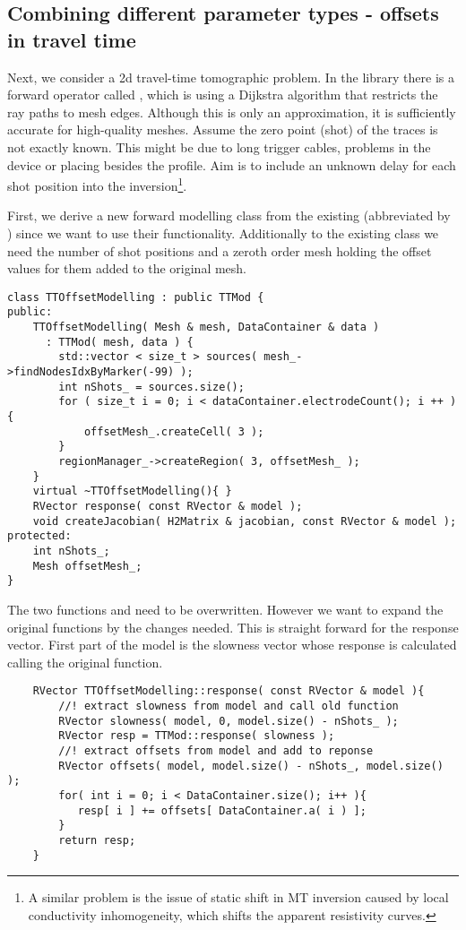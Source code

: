 \subsection{Combining different parameter types - offsets in travel time}\label{sec:ttoffset}
Next, we consider a 2d travel-time tomographic problem.
In the library there is a forward operator called , which is using a Dijkstra \citep{dijkstra} algorithm that restricts the ray paths to mesh edges. Although this is only an approximation, it is sufficiently accurate for high-quality meshes.
Assume the zero point (shot) of the traces is not exactly known. This might be due to long trigger cables, problems in the device or placing besides the profile.
Aim is to include an unknown delay for each shot position into the inversion\footnote{A similar problem is the issue of static shift in MT inversion caused by local conductivity inhomogeneity, which shifts the apparent resistivity curves.}.

First, we derive a new forward modelling class   from the existing  (abbreviated by ) since we want to use their functionality.
Additionally to the existing class we need the number of shot positions and a zeroth order mesh holding the offset values for them added to the original mesh.
\begin{lstlisting}
class TTOffsetModelling : public TTMod {
public:
    TTOffsetModelling( Mesh & mesh, DataContainer & data )
      : TTMod( mesh, data ) {
        std::vector < size_t > sources( mesh_->findNodesIdxByMarker(-99) );
        int nShots_ = sources.size();
        for ( size_t i = 0; i < dataContainer.electrodeCount(); i ++ ){
            offsetMesh_.createCell( 3 );
        }
        regionManager_->createRegion( 3, offsetMesh_ );			 
    }
    virtual ~TTOffsetModelling(){ }
    RVector response( const RVector & model );
    void createJacobian( H2Matrix & jacobian, const RVector & model );
protected:
    int nShots_;
    Mesh offsetMesh_;
}
\end{lstlisting}

The two functions  and  need to be overwritten.
However we want to expand the original functions by the changes needed.
This is straight forward for the response vector.
First part of the model is the slowness vector whose response is calculated calling the original function.

\begin{lstlisting}
    RVector TTOffsetModelling::response( const RVector & model ){
        //! extract slowness from model and call old function
        RVector slowness( model, 0, model.size() - nShots_ );
        RVector resp = TTMod::response( slowness );
        //! extract offsets from model and add to reponse
        RVector offsets( model, model.size() - nShots_, model.size() );
        for( int i = 0; i < DataContainer.size(); i++ ){
           resp[ i ] += offsets[ DataContainer.a( i ) ];
        }
        return resp;
    }
\end{lstlisting}

